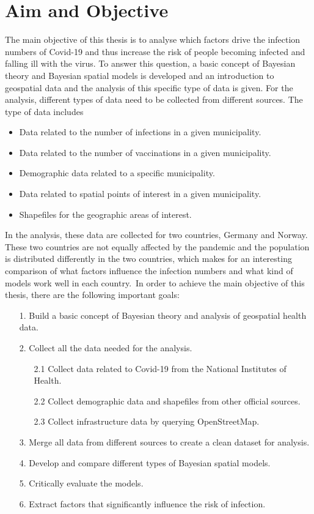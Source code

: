 \section{Aim and Objective}
The main objective of this thesis is to analyse which factors drive the infection numbers of Covid-19 and thus increase the risk of people becoming infected and falling ill with the virus. To answer this question, a basic concept of Bayesian theory and Bayesian spatial models is developed and an introduction to geospatial data and the analysis of this specific type of data is given. For the analysis, different types of data need to be collected from different sources. The type of data includes
\begin{itemize}
    \item Data related to the number of infections in a given municipality.
    \item Data related to the number of vaccinations in a given municipality.
    \item Demographic data related to a specific municipality.
    \item Data related to spatial points of interest in a given municipality.
    \item Shapefiles for the geographic areas of interest.
\end{itemize}
In the analysis, these data are collected for two countries, Germany and Norway. These two countries are not equally affected by the pandemic and the population is distributed differently in the two countries, which makes for an interesting comparison of what factors influence the infection numbers and what kind of models work well in each country.\
In order to achieve the main objective of this thesis, there are the following important goals:
\begin{itemize}
    \item[1.] Build a basic concept of Bayesian theory and analysis of geospatial health data.
    \item[2.] Collect all the data needed for the analysis.
    \begin{itemize}
    \item[2.1] Collect data related to Covid-19 from the National Institutes of Health.
    \item[2.2] Collect demographic data and shapefiles from other official sources.
    \item[2.3] Collect infrastructure data by querying OpenStreetMap.
    \end{itemize}
    \item[3.] Merge all data from different sources to create a clean dataset for analysis.
    \item[4.] Develop and compare different types of Bayesian spatial models.
    \item[5.] Critically evaluate the models.
    \item[6.] Extract factors that significantly influence the risk of infection.
\end{itemize}
\clearpage
